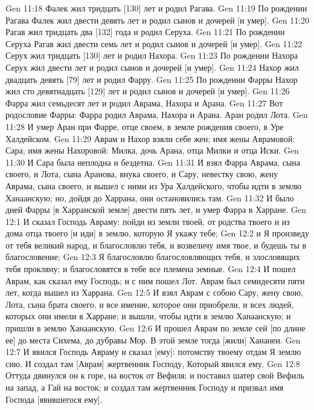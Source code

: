 \vs Gen 11:18 Фалек жил тридцать [130] лет и родил Рагава.
\vs Gen 11:19 По рождении Рагава Фалек жил двести девять лет и родил сынов и дочерей [и умер].
\vs Gen 11:20 Рагав жил тридцать два [132] года и родил Серуха.
\vs Gen 11:21 По рождении Серуха Рагав жил двести семь лет и родил сынов и дочерей [и умер].
\vs Gen 11:22 Серух жил тридцать [130] лет и родил Нахора.
\vs Gen 11:23 По рождении Нахора Серух жил двести лет и родил сынов и дочерей [и умер].
\vs Gen 11:24 Нахор жил двадцать девять [79] лет и родил Фарру.
\vs Gen 11:25 По рождении Фарры Нахор жил сто девятнадцать [129] лет и родил сынов и дочерей [и умер].
\vs Gen 11:26 Фарра жил семьдесят лет и родил Аврама, Нахора и Арана.
\rsbpar\vs Gen 11:27 Вот родословие Фарры: Фарра родил Аврама, Нахора и Арана. Аран родил Лота.
\vs Gen 11:28 И умер Аран при Фарре, отце своем, в земле рождения своего, в Уре Халдейском.
\vs Gen 11:29 Аврам и Нахор взяли себе жен; имя жены Аврамовой: Сара; имя жены Нахоровой: Милка, дочь Арана, отца Милки и отца Иски.
\vs Gen 11:30 И Сара была неплодна и бездетна.
\vs Gen 11:31 И взял Фарра Аврама, сына своего, и Лота, сына Аранова, внука своего, и Сару, невестку свою, жену Аврама, сына своего, и вышел с ними из Ура Халдейского, чтобы идти в землю Ханаанскую; но, дойдя до Харрана, они остановились там.
\vs Gen 11:32 И было дней  Фарры [в Харранской земле] двести пять лет, и умер Фарра в Харране.
\vs Gen 12:1 И сказал Господь Авраму: пойди из земли твоей, от родства твоего и из дома отца твоего [и иди] в землю, которую Я укажу тебе;
\vs Gen 12:2 и Я произведу от тебя великий народ, и благословлю тебя, и возвеличу имя твое, и будешь ты в благословение;
\vs Gen 12:3 Я благословлю благословляющих тебя, и злословящих тебя прокляну; и благословятся в тебе все племена земные.
\rsbpar\vs Gen 12:4 И пошел Аврам, как сказал ему Господь; и с ним пошел Лот. Аврам был семидесяти пяти лет, когда вышел из Харрана.
\vs Gen 12:5 И взял Аврам с собою Сару, жену свою, Лота, сына брата своего, и все имение, которое они приобрели, и всех людей, которых они имели в Харране; и вышли, чтобы идти в землю Ханаанскую; и пришли в землю Ханаанскую.
\vs Gen 12:6 И прошел Аврам по земле сей [по длине ее] до места Сихема, до дубравы Мор. В этой земле тогда [жили] Хананеи.
\vs Gen 12:7 И явился Господь Авраму и сказал [ему]: потомству твоему отдам Я землю сию. И создал там [Аврам] жертвенник Господу, Который явился ему.
\vs Gen 12:8 Оттуда двинулся он к горе, на восток от Вефиля; и поставил шатер свой  Вефиль  на запад, а Гай на восток; и создал там жертвенник Господу и призвал имя Господа [явившегося ему].
